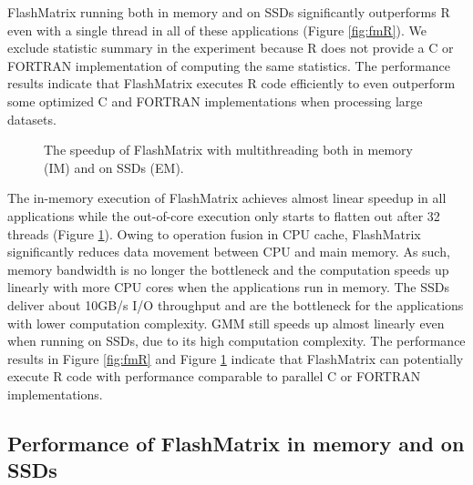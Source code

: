 FlashMatrix running both in memory and on SSDs significantly outperforms R
even with a single thread in all of these applications (Figure \ref{fig:fmR}).
We exclude statistic summary in the experiment because R does not provide
a C or FORTRAN implementation of computing the same statistics. The performance
results indicate that FlashMatrix executes R code efficiently to even outperform
some optimized C and FORTRAN implementations when processing large datasets.

\begin{figure}
	\begin{center}
		\footnotesize
		\vspace{-15pt}
		
		\vspace{-10pt}
		\caption{The speedup of FlashMatrix with multithreading both in memory (IM)
		and on SSDs (EM).}
		\label{fig:speedup}
	\end{center}
\end{figure}

The in-memory execution of FlashMatrix achieves almost linear speedup in all
applications while the out-of-core execution only
starts to flatten out after 32 threads (Figure \ref{fig:speedup}). Owing to
operation fusion in CPU cache, FlashMatrix significantly reduces data movement
between CPU and main memory. As such, memory bandwidth is no longer
the bottleneck and the computation speeds up linearly with more CPU cores
when the applications run in memory. The SSDs deliver about 10GB/s I/O throughput
and are the bottleneck for the applications with lower computation complexity.
GMM still speeds up almost linearly even when running on SSDs, due to its high
computation complexity. The performance results in Figure \ref{fig:fmR} and Figure
\ref{fig:speedup} indicate that FlashMatrix can potentially execute R code with
performance comparable to parallel C or FORTRAN implementations.

%		

\subsection{Performance of FlashMatrix in memory and on SSDs}

